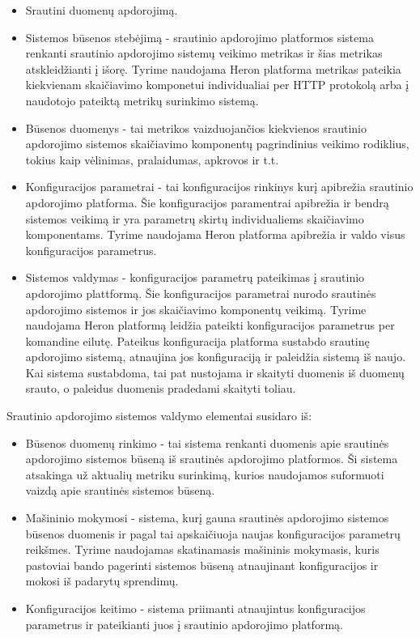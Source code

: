 \documentclass{VUMIFPSbakalaurinis}
\begin{document}
\begin{itemize}
    \item Srautini duomenų apdorojimą.
    \item Sistemos būsenos stebėjimą - srautinio apdorojimo platformos sistema renkanti srautinio apdorojimo sistemų veikimo metrikas ir šias metrikas atskleidžianti į išorę. Tyrime naudojama Heron platforma metrikas pateikia kiekvienam skaičiavimo komponetui individualiai per HTTP protokolą arba į naudotojo pateiktą metrikų surinkimo sistemą.
    \item Būsenos duomenys - tai metrikos vaizduojančios kiekvienos srautinio apdorojimo sistemos skaičiavimo komponentų pagrindinius veikimo rodiklius, tokius kaip vėlinimas, pralaidumas, apkrovos ir t.t.
    \item Konfiguracijos parametrai - tai konfiguracijos rinkinys kurį apibrežia srautinio apdorojimo platforma. Šie konfiguracijos paramentrai apibrežia ir bendrą sistemos veikimą ir yra parametrų skirtų individualiems skaičiavimo komponentams. Tyrime naudojama Heron platforma apibrežia ir valdo visus konfiguracijos parametrus.
    \item Sistemos valdymas - konfiguracijos parametrų pateikimas į srautinio apdorojimo plattformą. Šie konfiguracijos parametrai nurodo srautinės apdorojimo sistemos ir jos skaičiavimo komponentų veikimą. Tyrime naudojama Heron platformą leidžia pateikti konfiguracijos parametrus per komandine eilutę. Pateikus konfiguracija platforma sustabdo srautinę apdorojimo sistemą, atnaujina jos konfiguraciją ir paleidžia sistemą iš naujo. Kai sistema sustabdoma, tai pat nustojama ir skaityti duomenis iš duomenų srauto, o paleidus duomenis pradedami skaityti toliau.
\end{itemize}
Srautinio apdorojimo sistemos valdymo elementai susidaro iš:
\begin{itemize}
    \item Būsenos duomenų rinkimo - tai sistema renkanti duomenis apie srautinės apdorojimo sistemos būseną iš srautinės apdorojimo platformos. Ši sistema atsakinga už aktualių metriku surinkimą, kurios naudojamos suformuoti vaizdą apie srautinės sistemos būseną.
    \item Mašininio mokymosi - sistema, kurį gauna srautinės apdorojimo sistemos būsenos duomenis ir pagal tai apskaičiuoja naujas konfiguracijos parametrų reikšmes. Tyrime naudojamas skatinamasis mašininis mokymasis, kuris pastoviai bando pagerinti sistemos būseną atnaujinant konfiguracijos ir mokosi iš padarytų sprendimų.
    \item Konfiguracijos keitimo - sistema priimanti atnaujintus konfiguracijos parametrus ir pateikianti juos į srautinio apdorojimo platformą. 
\end{itemize}
\end{document}
